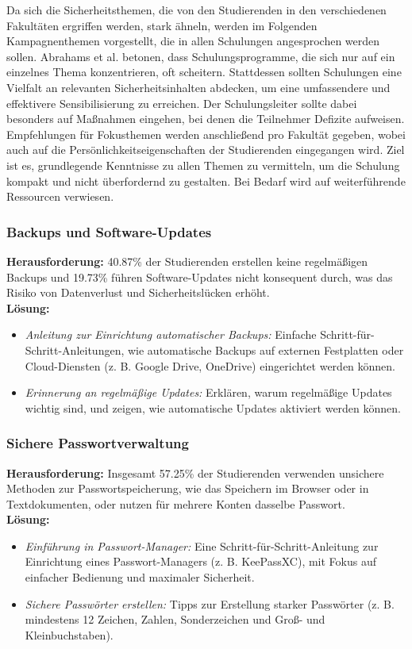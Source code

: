 \documentclass[german,report]{i1thesis}
\begin{document}
Da sich die Sicherheitsthemen, die von den Studierenden in den verschiedenen Fakultäten ergriffen werden, stark ähneln, werden im Folgenden Kampagnenthemen vorgestellt, die in allen Schulungen angesprochen werden sollen. Abrahams et al. \cite{abrahams2024cybersecurity} betonen, dass Schulungsprogramme, die sich nur auf ein einzelnes Thema konzentrieren, oft scheitern. Stattdessen sollten Schulungen eine Vielfalt an relevanten Sicherheitsinhalten abdecken, um eine umfassendere und effektivere Sensibilisierung zu erreichen. Der Schulungsleiter sollte dabei besonders auf Maßnahmen eingehen, bei denen die Teilnehmer Defizite aufweisen. Empfehlungen für Fokusthemen werden anschließend pro Fakultät gegeben, wobei auch auf die Persönlichkeitseigenschaften der Studierenden eingegangen wird. Ziel ist es, grundlegende Kenntnisse zu allen Themen zu vermitteln, um die Schulung kompakt und nicht überfordernd zu gestalten. Bei Bedarf wird auf weiterführende Ressourcen verwiesen.

\subsubsection{Backups und Software-Updates}
\textbf{Herausforderung:} 40.87\% der Studierenden erstellen keine regelmäßigen Backups und 19.73\% führen Software-Updates nicht konsequent durch, was das Risiko von Datenverlust und Sicherheitslücken erhöht.\\
\newpage
\textbf{Lösung:}
\begin{itemize}
    \item \textit{Anleitung zur Einrichtung automatischer Backups:} Einfache Schritt-für-Schritt-Anleitungen, wie automatische Backups auf externen Festplatten oder Cloud-Diensten (z. B. Google Drive, OneDrive) eingerichtet werden können.
    \item \textit{Erinnerung an regelmäßige Updates:} Erklären, warum regelmäßige Updates wichtig sind, und zeigen, wie automatische Updates aktiviert werden können.
\end{itemize}

\subsubsection{Sichere Passwortverwaltung}
\textbf{Herausforderung:} Insgesamt 57.25\%  der Studierenden verwenden unsichere Methoden zur Passwortspeicherung, wie das Speichern im Browser oder in Textdokumenten, oder nutzen für mehrere Konten dasselbe Passwort. \\
\textbf{Lösung:}
\begin{itemize}
    \item \textit{Einführung in Passwort-Manager:} Eine Schritt-für-Schritt-Anleitung zur Einrichtung eines Passwort-Managers (z. B. KeePassXC), mit Fokus auf einfacher Bedienung und maximaler Sicherheit.
    \item \textit{Sichere Passwörter erstellen:} Tipps zur Erstellung starker Passwörter (z. B. mindestens 12 Zeichen, Zahlen, Sonderzeichen und Groß- und Kleinbuchstaben).
\end{itemize}
\end{document}
